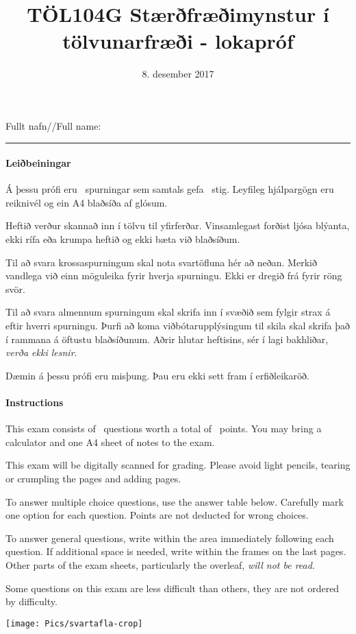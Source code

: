 \documentclass[addpoints]{exam}
\author{}
\date{}
\title{TÖL104G Stærðfræðimynstur í tölvunarfræði - lokapróf}
\author{}
\date{8. desember 2017}
\begin{document}
Fullt nafn//Full name: \vspace*{1mm} \hrule

\begin{center}
    \begin{minipage}{.8\textwidth}
    
    \vspace{0.7cm}
    \paragraph{Leiðbeiningar} Á þessu prófi eru \numquestions\ spurningar sem samtals gefa \numpoints\ stig. Leyfileg hjálpargögn eru reiknivél og ein A4 blaðsíða af glósum.
    
    Heftið verður skannað inn í tölvu til yfirferðar. Vinsamlegast forðist ljósa blýanta, ekki rífa eða krumpa heftið og ekki bæta við blaðsíðum. 
    
    Til að svara krossaspurningum skal nota svartöfluna hér að neðan. Merkið vandlega við einn möguleika fyrir hverja spurningu. Ekki er dregið frá fyrir röng svör. 
    
    Til að svara almennum spurningum skal skrifa inn í svæðið sem fylgir strax á eftir hverri spurningu. Þurfi að koma viðbótarupplýsingum til skila skal skrifa það í rammana á öftustu blaðsíðunum. Aðrir hlutar heftisins, sér í lagi bakhliðar, \emph{verða ekki lesnir}.
    
    Dæmin á þessu prófi eru misþung. Þau eru ekki sett fram í erfiðleikaröð.
    
    \vspace{0.7cm}
    
    \paragraph{Instructions} This exam consists of \numquestions\ questions worth a total of \numpoints\ points. You may bring a calculator and one A4 sheet of notes to the exam.
    
    This exam will be digitally scanned for grading. Please avoid light pencils, tearing or crumpling the pages and adding pages. 
    
    To answer multiple choice questions, use the answer table below. Carefully mark one option for each question. Points are not deducted for wrong choices. 
    
    To answer general questions, write within the area immediately following each question. If additional space is needed, write within the frames on the last pages. Other parts of the exam sheets, particularly the overleaf, \emph{will not be read}.
    
    Some questions on this exam are less difficult than others, they are not ordered by difficulty.
    
    \end{minipage}

    \vspace*{1cm}

    \texttt{[image: Pics/svartafla-crop]}
\end{center}
\end{document}
